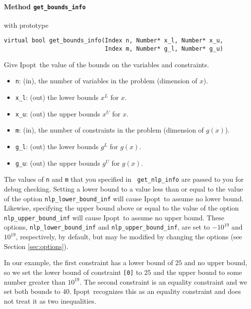 \documentclass[10pt]{article}
\newcommand{\Ipopt}{{\sc Ipopt}}
\begin{document}
\paragraph{Method {\texttt{get\_bounds\_info}}} with prototype
\begin{verbatim}
virtual bool get_bounds_info(Index n, Number* x_l, Number* x_u,
                             Index m, Number* g_l, Number* g_u)
\end{verbatim}
Give \Ipopt\ the value of the bounds on the variables and constraints.
\begin{itemize}
\item {\tt n}: (in), the number of variables in the problem (dimension of $x$). 
\item {\tt x\_l}: (out) the lower bounds $x^L$ for $x$. 
\item {\tt x\_u}: (out) the upper bounds $x^U$ for $x$.
\item {\tt m}: (in), the number of constraints in the problem (dimension of $g(x)$).
\item {\tt g\_l}: (out) the lower bounds $g^L$ for $g(x)$. 
\item {\tt g\_u}: (out) the upper bounds $g^U$ for $g(x)$.
\end{itemize}
The values of {\tt n} and {\tt m} that you specified in {\tt
  get\_nlp\_info} are passed to you for debug checking.  Setting a
lower bound to a value less than or equal to the value of the option
{\tt nlp\_lower\_bound\_inf} will cause \Ipopt\ to assume no lower
bound. Likewise, specifying the upper bound above or equal to the
value of the option {\tt nlp\_upper\_bound\_inf} will cause \Ipopt\ to
assume no upper bound.  These options, {\tt nlp\_lower\_bound\_inf}
and {\tt nlp\_upper\_bound\_inf}, are set to $-10^{19}$ and $10^{19}$,
respectively, by default, but may be modified by changing the options
(see Section \ref{sec:options}).

In our example, the first constraint has a lower bound of $25$ and no upper
bound, so we set the lower bound of constraint {\tt [0]} to $25$ and
the upper bound to some number greater than $10^{19}$. The second
constraint is an equality constraint and we set both bounds to
$40$. \Ipopt\ recognizes this as an equality constraint and does not
treat it as two inequalities.
\end{document}
